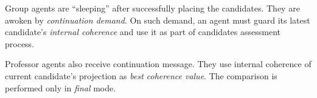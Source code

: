 \documentclass[../../ThesisDoc]{subfiles}
\begin{document}
Group agents are ``sleeping'' after successfully placing the candidates.
They are awoken by \emph{continuation demand}. On such demand, an agent
must guard its latest candidate's \emph{internal coherence} and use it as part
of candidates assessment process.

Professor agents also receive continuation message. They use internal coherence
of current candidate's projection as \emph{best coherence value}.
The comparison is performed only in \emph{final} mode.


\end{document}
